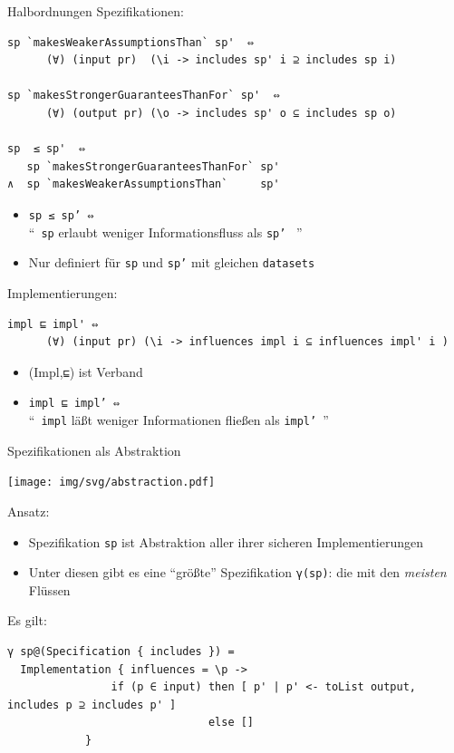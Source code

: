 \documentclass[18pt]{beamer}
\newcommand{\kit}[1]{\textcolor{kit-green100}{#1}}
\begin{document}
\begin{frame}[fragile]{Halbordnungen}
\kit{Spezifikationen:}
\begin{verbatim}
sp `makesWeakerAssumptionsThan` sp'  ⇔
      (∀) (input pr)  (\i -> includes sp' i ⊇ includes sp i)

sp `makesStrongerGuaranteesThanFor` sp'  ⇔
      (∀) (output pr) (\o -> includes sp' o ⊆ includes sp o)

sp  ≤ sp'  ⇔
   sp `makesStrongerGuaranteesThanFor` sp'
∧  sp `makesWeakerAssumptionsThan`     sp'
\end{verbatim}
\begin{itemize}
   \item \texttt{sp  ≤ sp'  ⇔ } \\
         \enquote{\ \texttt{sp} erlaubt weniger Informationsfluss als \texttt{sp'} \ }
   \item Nur definiert für \texttt{sp} und \texttt{sp'} mit gleichen \texttt{datasets}
\end{itemize}

\vfill

\kit{Implementierungen:}
\begin{verbatim}
impl ⊑ impl' ⇔
      (∀) (input pr) (\i -> influences impl i ⊆ influences impl' i )
\end{verbatim}
\begin{itemize}
   \item (Impl,\texttt{⊑}) ist Verband
   \item \texttt{impl ⊑ impl'  ⇔}  \\
         \enquote{\ \texttt{impl} läßt weniger Informationen fließen als \texttt{impl'}\ }
\end{itemize}

\end{frame}

\begin{frame}[fragile]{Spezifikationen als Abstraktion}
\begin{center}
\texttt{[image: img/svg/abstraction.pdf]}
\end{center}
\kit{Ansatz:}
\begin{itemize}
  \item Spezifikation \texttt{sp} ist Abstraktion aller ihrer sicheren Implementierungen
  \item Unter diesen gibt es eine \enquote{größte} Spezifikation \texttt{γ(sp)}: die mit den \emph{meisten} Flüssen
\end{itemize}
\kit{Es gilt:}
\begin{verbatim}
γ sp@(Specification { includes }) =
  Implementation { influences = \p ->
                if (p ∈ input) then [ p' | p' <- toList output, includes p ⊇ includes p' ]
                               else []
            }
\end{verbatim}
\end{frame}
\end{document}
